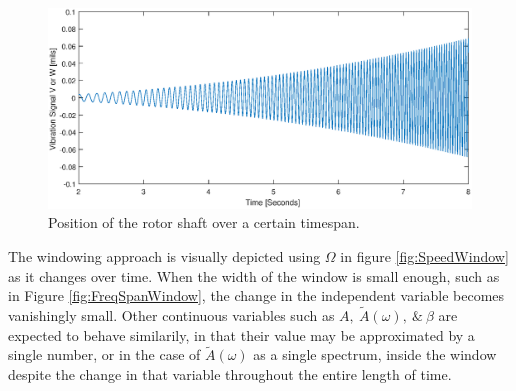 \begin{figure}
	\centering
	\includegraphics[width=\linewidth]{./figures/Pos_Over_Time.eps}
	\caption{Position of the rotor shaft over a certain timespan.}
	\label{fig:PosOverTime}
\end{figure}
The windowing approach is visually depicted using $ \Omega $ in figure \ref{fig:SpeedWindow} as it changes over time. When the width of the window is small enough, such as in Figure \ref{fig:FreqSpanWindow}, the change in the independent variable becomes vanishingly small. Other continuous variables such as $ A,\ \tilde{A}(\omega),\ \&\ \beta $ are expected to behave similarily, in that their value may be approximated by a single number, or in the case of $ \tilde{A}(\omega) $ as a single spectrum, inside the window despite the change in that variable throughout the entire length of time.
